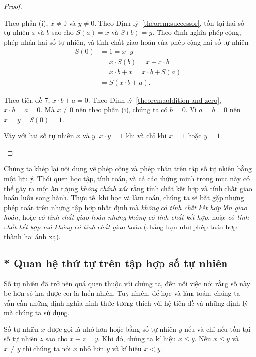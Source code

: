 \begin{proof}
\begin{enumerate}[label={(\roman*)}]
              Theo phần (i), $x\ne 0$ và $y\ne 0$. Theo Định lý~\ref{theorem:successor}, tồn tại hai số tự nhiên $a$ và $b$ sao cho $S(a) = x$ và $S(b) = y$. Theo định nghĩa phép cộng, phép nhân hai số tự nhiên, và tính chất giao hoán của phép cộng hai số tự nhiên
              \begin{align*}
                  S(0) & = 1 = x\cdot y                   \\
                       & = x\cdot S(b) = x + x\cdot b     \\
                       & = x\cdot b + x = x\cdot b + S(a) \\
                       & = S(x\cdot b + a).
              \end{align*}

              Theo tiên đề 7, $x\cdot b + a = 0$. Theo Định lý~\ref{theorem:addition-and-zero}, $x\cdot b = a = 0$. Mà $x\ne 0$ nên theo phần (i), chúng ta có $b = 0$. Vì $a = b = 0$ nên $x = y = S(0) = 1$.

              Vậy với hai số tự nhiên $x$ và $y$, $x\cdot y = 1$ khi và chỉ khi $x = 1$ hoặc $y = 1$.
    \end{enumerate}
\end{proof}

Chúng ta khép lại nội dung về phép cộng và phép nhân trên tập số tự nhiên bằng một lưu ý. Thói quen học tập, tính toán, và cả các chứng minh trong mục này có thể gây ra một ấn tượng \textit{không chính xác} rằng tính chất kết hợp và tính chất giao hoán luôn song hành. Thực tế, khi học và làm toán, chúng ta sẽ bắt gặp những phép toán trên những tập hợp nhất định mà \textit{không có tính chất kết hợp lẫn giao hoán}, hoặc \textit{có tính chất giao hoán nhưng không có tính chất kết hợp}, hoặc \textit{có tính chất kết hợp mà không có tính chất giao hoán} (chẳng hạn như phép toán hợp thành hai ánh xạ).

\subsection{* Quan hệ thứ tự trên tập hợp số tự nhiên}

Số tự nhiên đã trở nên quá quen thuộc với chúng ta, đến nỗi việc nói rằng số này bé hơn số kia được coi là hiển nhiên. Tuy nhiên, để học và làm toán, chúng ta vẫn cần những định nghĩa hình thức tương thích với hệ tiên đề và những định lý mà chúng ta sử dụng.

\begin{definition}
    Số tự nhiên $x$ được gọi là nhỏ hơn hoặc bằng số tự nhiên $y$ nếu và chỉ nếu tồn tại số tự nhiên $z$ sao cho $x + z = y$. Khi đó, chúng ta kí hiệu $x\leq y$. Nếu $x\leq y$ và $x\ne y$ thì chúng ta nói $x$ nhỏ hơn $y$ và kí hiệu $x < y$.
\end{definition}

